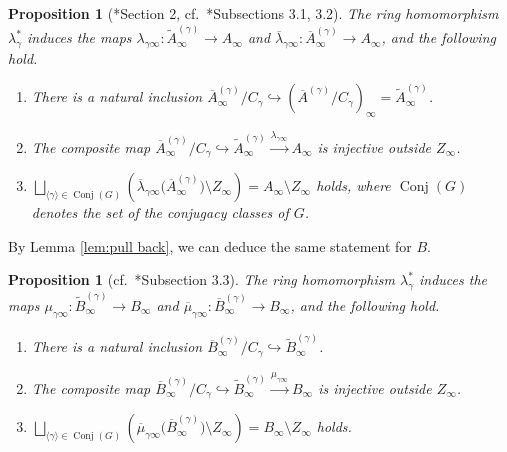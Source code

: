 \documentclass[a4paper,11pt]{amsart}
\newtheorem{prop}[thm]{Proposition}
\theoremstyle{definition}
\theoremstyle{remark}
\begin{document}
\begin{prop}[{\cite{DL02}*{Section 2}, cf.\ \cite{NS22}*{Subsections 3.1, 3.2}}]\label{prop:DL_A}
The ring homomorphism $\lambda^* _{\gamma}$ induces the maps 
$\lambda_{\gamma \infty}: \widetilde{A}^{(\gamma)}_{\infty} \to A_{\infty}$ and 
$\overline{\lambda}_{\gamma \infty}: \overline{A}^{(\gamma)} _{\infty} \to A_{\infty}$, 
and the following hold. 
\begin{enumerate}
\item There is a natural inclusion $\overline{A}^{(\gamma)} _{\infty}/C_{\gamma} \hookrightarrow \left( \overline{A}^{(\gamma)} /C_{\gamma} \right)_{\infty} = \widetilde{A}^{(\gamma)}_{\infty}$. 

\item The composite map $\overline{A}^{(\gamma)} _{\infty}/C_{\gamma} \hookrightarrow \widetilde{A}^{(\gamma)}_{\infty}\xrightarrow{\lambda _{\gamma \infty}} A_{\infty}$ is injective outside $Z_{\infty}$. 

\item $\bigsqcup _{\langle \gamma \rangle \in \operatorname{Conj}(G)} 
\left( \overline{\lambda}_{\gamma \infty} \bigl( \overline{A}^{(\gamma)} _{\infty} \bigr) \setminus Z_{\infty} \right)
= A_{\infty} \setminus Z_{\infty}$ holds, where $\operatorname{Conj}(G)$ denotes the set of the conjugacy classes of $G$. 
\end{enumerate}
\end{prop}

\noindent
By Lemma \ref{lem:pull back}, we can deduce the same statement for $B$. 
\begin{prop}[{cf.\ \cite{NS22}*{Subsection 3.3}}]\label{prop:DL_X}
The ring homomorphism $\lambda^* _{\gamma}$ induces the maps 
$\mu_{\gamma \infty}:\widetilde{B}_{\infty} ^{(\gamma)} \to B_{\infty}$ and 
$\overline{\mu}_{\gamma \infty}: \overline{B}^{(\gamma)}_{\infty} \to B_{\infty}$, 
and the following hold. 
\begin{enumerate}
\item There is a natural inclusion $\overline{B}_{\infty} ^{(\gamma)} / C_{\gamma} \hookrightarrow \widetilde{B}_{\infty} ^{(\gamma)}$. 

\item The composite map $\overline{B}_{\infty} ^{(\gamma)} / C_{\gamma} \hookrightarrow \widetilde{B}_{\infty} ^{(\gamma)} 
\xrightarrow{\mu _{\gamma \infty}} B_{\infty}$ is injective outside $Z_{\infty}$. 

\item $\bigsqcup _{\langle \gamma \rangle \in \operatorname{Conj}(G)} 
\left( \overline{\mu}_{\gamma \infty} \bigl( \overline{B}^{(\gamma)}_{\infty} \bigr) \setminus Z_{\infty} \right)
= B_{\infty} \setminus Z_{\infty}$ holds. 
\end{enumerate}
\end{prop}
\end{document}
